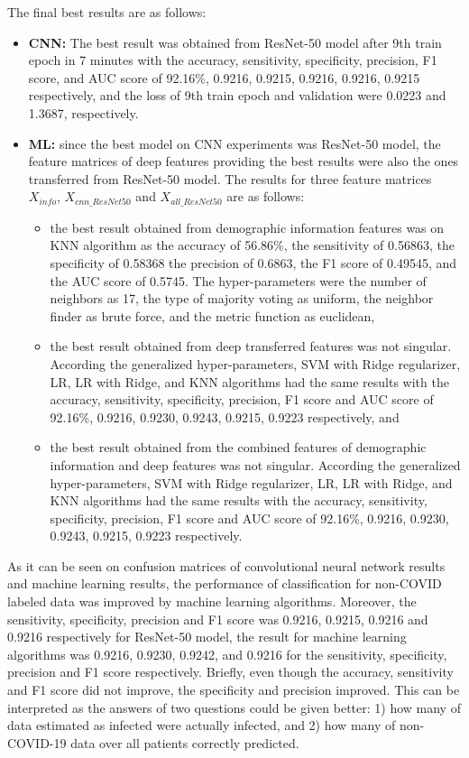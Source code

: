 The final best results are as follows:
\begin{itemize}
    \item \textbf{CNN:} The best result was obtained from ResNet-50 model after 9th train epoch in 7 minutes with the accuracy, sensitivity, specificity, precision, F1 score, and AUC score of 92.16\%, 0.9216, 0.9215, 0.9216, 0.9216, 0.9215 respectively, and the loss of 9th train epoch and validation were 0.0223 and 1.3687, respectively.
    \item \textbf{ML:} since the best model on CNN experiments was ResNet-50 model, the feature matrices of deep features providing the best results were also the ones transferred from ResNet-50 model. The results for three feature matrices $X_{info}$, $X_{cnn\_ResNet50}$ and $X_{all\_ResNet50}$ are as follows:
    \begin{itemize}
        \item the best result obtained from demographic information features was on KNN algorithm as the accuracy of 56.86\%, the sensitivity of 0.56863, the specificity of 0.58368 the precision of 0.6863, the F1 score of 0.49545, and the AUC score of 0.5745. The hyper-parameters were the number of neighbors as 17, the type of majority voting as uniform, the neighbor finder as brute force, and the metric function as euclidean,
        \item the best result obtained from deep transferred features was not singular. According the generalized hyper-parameters, SVM with Ridge regularizer, LR, LR with Ridge, and KNN algorithms had the same results with the accuracy, sensitivity, specificity, precision, F1 score and AUC score of 92.16\%, 0.9216, 0.9230, 0.9243, 0.9215, 0.9223 respectively, and
        \item the best result obtained from the combined features of demographic information and deep features was not singular. According the generalized hyper-parameters, SVM with Ridge regularizer, LR, LR with Ridge, and KNN algorithms had the same results with the accuracy, sensitivity, specificity, precision, F1 score and AUC score of 92.16\%, 0.9216, 0.9230, 0.9243, 0.9215, 0.9223 respectively.
    \end{itemize}
\end{itemize}

As it can be seen on confusion matrices of convolutional neural network results and machine learning results, the performance of classification for non-COVID labeled data was improved by machine learning algorithms. Moreover, the sensitivity, specificity, precision and F1 score was 0.9216, 0.9215, 0.9216 and 0.9216 respectively for ResNet-50 model, the result for machine learning algorithms was 0.9216, 0.9230, 0.9242, and 0.9216 for the sensitivity, specificity, precision and F1 score respectively. Briefly, even though the accuracy, sensitivity and F1 score did not improve, the specificity and precision improved. This can be interpreted as the answers of two questions could be given better: 1) how many of data estimated as infected were actually infected, and 2) how many of non-COVID-19 data over all patients correctly predicted.


